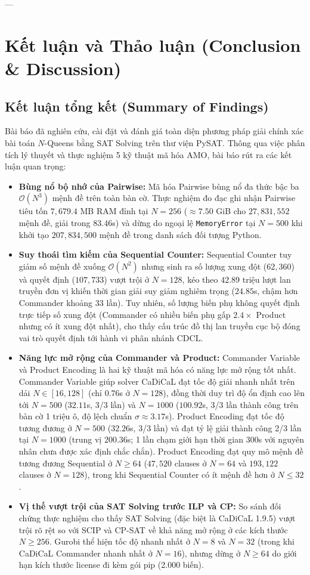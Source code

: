 \documentclass[11pt,a4paper]{article}
\begin{document}
---

\section{Kết luận và Thảo luận (Conclusion \& Discussion)}

\subsection{Kết luận tổng kết (Summary of Findings)}
Bài báo đã nghiên cứu, cài đặt và đánh giá toàn diện phương pháp giải chính xác bài toán $N$-Queens bằng SAT Solving trên thư viện PySAT. Thông qua việc phân tích lý thuyết và thực nghiệm 5 kỹ thuật mã hóa AMO, bài báo rút ra các kết luận quan trọng:
\begin{itemize}
    \item \textbf{Bùng nổ bộ nhớ của Pairwise:} Mã hóa Pairwise bùng nổ đa thức bậc ba $\mathcal{O}(N^3)$ mệnh đề trên toàn bàn cờ. Thực nghiệm đo đạc ghi nhận Pairwise tiêu tốn $7{,}679.4$ MB RAM đỉnh tại $N=256$ ($\approx 7.50$ GiB cho $27{,}831{,}552$ mệnh đề, giải trong $83.46$s) và dừng do ngoại lệ \texttt{MemoryError} tại $N=500$ khi khởi tạo $207{,}834{,}500$ mệnh đề trong danh sách đối tượng Python.
    \item \textbf{Suy thoái tìm kiếm của Sequential Counter:} Sequential Counter tuy giảm số mệnh đề xuống $\mathcal{O}(N^2)$ nhưng sinh ra số lượng xung đột ($62{,}360$) và quyết định ($107{,}733$) vượt trội ở $N=128$, kéo theo $42.89$ triệu lượt lan truyền đơn vị khiến thời gian giải suy giảm nghiêm trọng ($24.85$s, chậm hơn Commander khoảng 33 lần). Tuy nhiên, số lượng biến phụ không quyết định trực tiếp số xung đột (Commander có nhiều biến phụ gấp $2.4\times$ Product nhưng có ít xung đột nhất), cho thấy cấu trúc đồ thị lan truyền cục bộ đóng vai trò quyết định tới hành vi phân nhánh CDCL.
    \item \textbf{Năng lực mở rộng của Commander và Product:} Commander Variable và Product Encoding là hai kỹ thuật mã hóa có năng lực mở rộng tốt nhất. Commander Variable giúp solver CaDiCaL đạt tốc độ giải nhanh nhất trên dải $N \in [16, 128]$ (chỉ $0.76$s ở $N=128$), đồng thời duy trì độ ổn định cao lên tới $N=500$ ($32.11$s, 3/3 lần) và $N=1000$ ($100.92$s, 3/3 lần thành công trên bàn cờ 1 triệu ô, độ lệch chuẩn $\sigma \approx 3.17$s). Product Encoding đạt tốc độ tương đương ở $N=500$ ($32.26$s, 3/3 lần) và đạt tỷ lệ giải thành công 2/3 lần tại $N=1000$ (trung vị $200.36$s; 1 lần chạm giới hạn thời gian 300s với nguyên nhân chưa được xác định chắc chắn). Product Encoding đạt quy mô mệnh đề tương đương Sequential ở $N \ge 64$ ($47{,}520$ clauses ở $N=64$ và $193{,}122$ clauses ở $N=128$), trong khi Sequential Counter có ít mệnh đề hơn ở $N \le 32$.
    \item \textbf{Vị thế vượt trội của SAT Solving trước ILP và CP:} So sánh đối chứng thực nghiệm cho thấy SAT Solving (đặc biệt là CaDiCaL 1.9.5) vượt trội rõ rệt so với SCIP và CP-SAT về khả năng mở rộng ở các kích thước $N \ge 256$. Gurobi thể hiện tốc độ nhanh nhất ở $N = 8$ và $N = 32$ (trong khi CaDiCaL Commander nhanh nhất ở $N = 16$), nhưng dừng ở $N \ge 64$ do giới hạn kích thước license đi kèm gói pip (2.000 biến).
\end{itemize}
\end{document}
